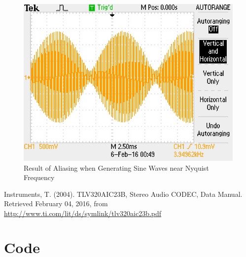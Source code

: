 \documentclass{article}
\begin{document}
\begin{figure}[h]
    \centering{}
    \includegraphics[scale=1]{TEK0001.JPG}
    \caption{Result of Aliasing when Generating Sine Waves near Nyquist Frequency}
\end{figure}

\newpage
\begin{thebibliography}{1}
 Instruments, T. (2004). TLV320AIC23B, Stereo Audio CODEC, Data Manual. Retrieved February 04, 2016, from \url{http://www.ti.com/lit/ds/symlink/tlv320aic23b.pdf}
\end{thebibliography}


\newpage
\appendix
\section{Code}
\end{document}
